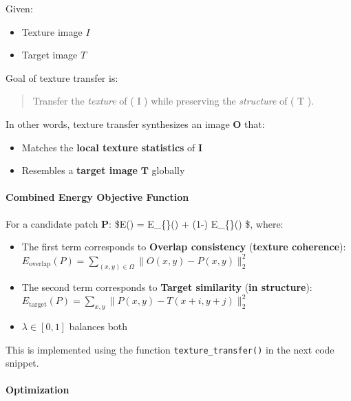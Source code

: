 \documentclass[11pt]{article}
\providecommand{\tightlist}{%
      \setlength{\itemsep}{0pt}\setlength{\parskip}{0pt}}
\begin{document}
Given:

\begin{itemize}
\tightlist
\item
  Texture image \(I\)
\item
  Target image \(T\)
\end{itemize}

Goal of texture transfer is:

\begin{quote}
Transfer the \emph{texture} of ( I ) while preserving the
\emph{structure} of ( T ).
\end{quote}

In other words, texture transfer synthesizes an image \(\mathbf{O}\)
that:

\begin{itemize}
\tightlist
\item
  Matches the \textbf{local texture statistics} of \(\mathbf{I}\)
\item
  Resembles a \textbf{target image} \(\mathbf{T}\) globally
\end{itemize}

\hypertarget{combined-energy-objective-function}{%
\paragraph{\texorpdfstring{\textbf{Combined Energy Objective
Function}}{Combined Energy Objective Function}}\label{combined-energy-objective-function}}

For a candidate patch \(\mathbf{P}\): \$E() =
\lambda E\_\{\}() + (1-\lambda)
E\_\{\}() \$, where:

\begin{itemize}
\tightlist
\item
  The first term corresponds to \textbf{Overlap consistency}
  (\textbf{texture coherence}):
  \(E_{\text{overlap}}(P) = \sum\limits_{(x,y)\in\Omega} \| O(x,y) - P(x,y) \|_2^2\)
\item
  The second term corresponds to \textbf{Target similarity} (\textbf{in
  structure}):
  \(E_{\text{target}}(P) = \sum\limits_{x,y} \| P(x,y) - T(x+i,y+j) \|_2^2\)
\item
  \(\lambda \in [0,1]\) balances both
\end{itemize}

This is implemented using the function \texttt{texture\_transfer()} in
the next code snippet.

\hypertarget{optimization}{%
\paragraph{\texorpdfstring{\textbf{Optimization}}{Optimization}}\label{optimization}}
\end{document}
